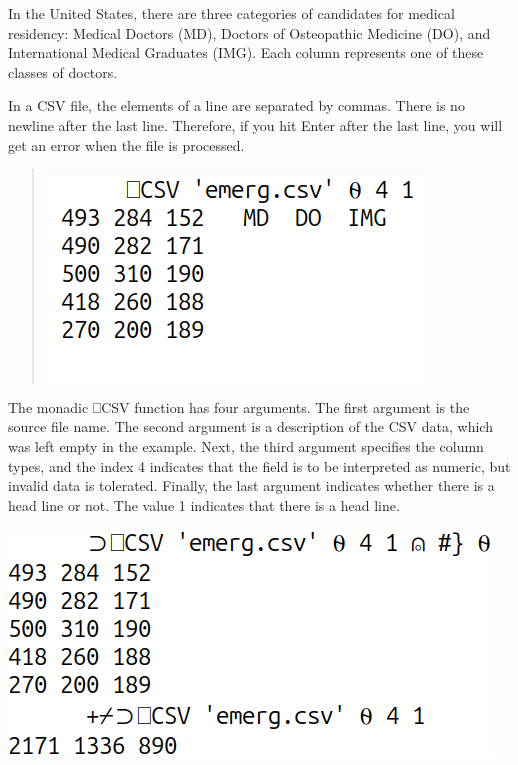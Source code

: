 \documentclass[a4paper,12pt]{book}
\begin{document}
In the United States, there are
three categories of candidates
for medical residency: Medical
Doctors (MD), Doctors of Osteopathic
Medicine (DO), and International
Medical Graduates (IMG). Each
column represents one of these
classes of doctors.

In a CSV file, the elements of
a line are separated by commas.
There is no newline after the
last line. Therefore, if you hit
Enter after the last line, you
will get an error when the file
is processed.
\begin{quote}
\includegraphics{srcfigs/CSVemerg.png}
\end{quote}
The monadic ⎕CSV function has four
arguments. The first argument is
the source file name. The second
argument is a description of the
CSV data, which was left empty in
the example. Next, the third
argument specifies the column
types, and the index 4 indicates
that the field is to be interpreted
as numeric, but invalid data is
tolerated. Finally, the last
argument indicates whether there
is a head line or not. The
value 1 indicates that there
is a head line.

\noindent
\includegraphics{srcfigs/CSV-remove-header.png}
\end{document}
